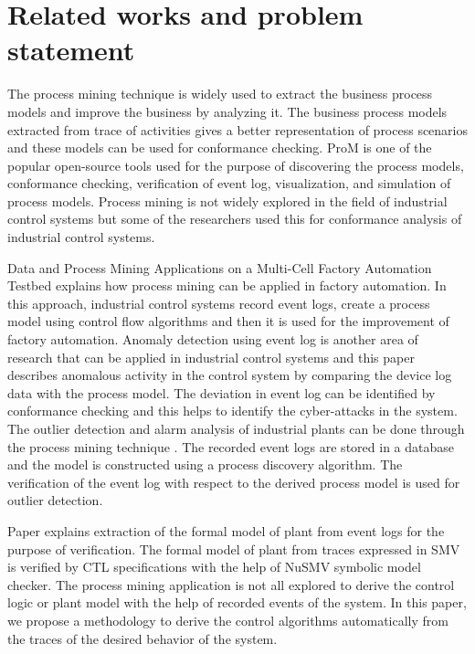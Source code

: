 \documentclass[conference]{IEEEtran}
\begin{document}
\section{Related works and problem statement}
\label{sec:relatedwork}

The process mining technique \cite{10.1007/BFb0101003} \cite{van2012process1} is widely used to extract the business process models and improve the business by analyzing it. The business process models extracted from trace of activities gives a better representation of process scenarios and these models can be used for conformance checking. ProM\cite{van2005prom} is one of the popular open-source tools used for the purpose of discovering the process models, conformance checking, verification of event log, visualization, and simulation of process models. Process mining is not widely explored in the field of industrial control systems but some of the researchers used this for conformance analysis of industrial control systems.


Data and Process Mining Applications on a Multi-Cell Factory Automation Testbed \cite{paper1} explains how process mining can be applied in factory automation. In this approach, industrial control systems record event logs, create a process model using control flow algorithms and then it is used for the improvement of factory automation. Anomaly detection using event log is another area of research that can be applied in industrial control systems and this paper \cite{paper2} describes anomalous activity in the control system by comparing the device log data with the process model. The deviation in event log can be identified by conformance checking and this helps to identify the cyber-attacks in the system. The outlier detection and alarm analysis of industrial plants can be done through the process mining technique \cite{paper3}. The recorded event logs are stored in a database and the model is constructed using a process discovery algorithm. The verification of the event log with respect to the derived process model is used for outlier detection.

Paper \cite{xavier2021plant} explains extraction of the formal model of plant from event logs for the purpose of verification. The formal model of plant from traces expressed in SMV is verified by CTL specifications with the help of NuSMV symbolic model checker. The process mining application is not all explored to derive the control logic or plant model  with the help of recorded events of the system. In this paper, we propose a methodology to derive the control algorithms automatically from the traces of the desired behavior of the system.
\end{document}
